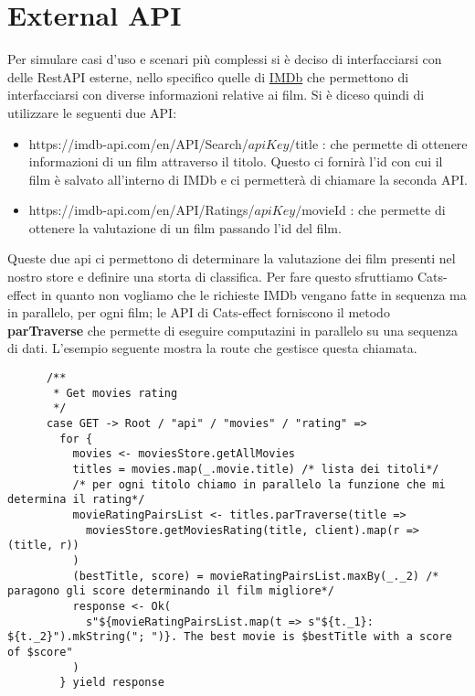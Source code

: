 \section{External API}
Per simulare casi d'uso  e scenari più complessi si è deciso di interfacciarsi con delle RestAPI esterne, nello specifico quelle di \href{https://imdb-api.com/}{IMDb} che permettono di interfacciarsi con diverse informazioni relative ai film. Si è diceso quindi di utilizzare le seguenti due API:
\begin{itemize}
    \item https://imdb-api.com/en/API/Search/$apiKey/$title : che permette di ottenere informazioni di un film attraverso il titolo. Questo ci fornirà l'id con cui il film è salvato all'interno di IMDb e ci permetterà di chiamare la seconda API.
    \item https://imdb-api.com/en/API/Ratings/$apiKey/$movieId : che permette di ottenere la valutazione di un film passando l'id del film.
\end{itemize}

\noindent Queste due api ci permettono di determinare la valutazione dei film presenti nel nostro store e definire una storta di classifica. Per fare questo sfruttiamo Cats-effect in quanto non vogliamo che le richieste IMDb vengano fatte in sequenza ma in parallelo, per ogni film; le API di Cats-effect forniscono il metodo \textbf{parTraverse} che permette di eseguire computazini in parallelo su una sequenza di dati. L'esempio seguente mostra la route che gestisce questa chiamata.

\begin{verbatim}
      /**
       * Get movies rating
       */
      case GET -> Root / "api" / "movies" / "rating" =>
        for {
          movies <- moviesStore.getAllMovies
          titles = movies.map(_.movie.title) /* lista dei titoli*/
          /* per ogni titolo chiamo in parallelo la funzione che mi determina il rating*/ 
          movieRatingPairsList <- titles.parTraverse(title => 
            moviesStore.getMoviesRating(title, client).map(r => (title, r))
          )
          (bestTitle, score) = movieRatingPairsList.maxBy(_._2) /* paragono gli score determinando il film migliore*/
          response <- Ok(
            s"${movieRatingPairsList.map(t => s"${t._1}: ${t._2}").mkString("; ")}. The best movie is $bestTitle with a score of $score"
          )
        } yield response
    
\end{verbatim}


